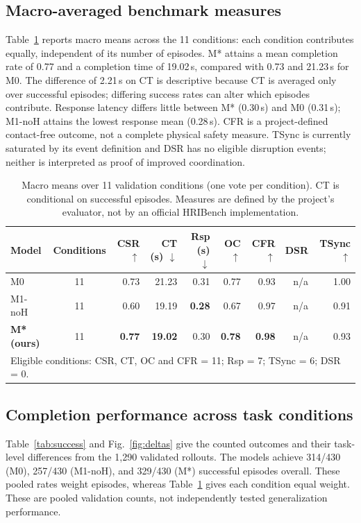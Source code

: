 \documentclass[conference]{IEEEtran}
\begin{document}
\subsection{Macro-averaged benchmark measures}
Table~\ref{tab:macro} reports macro means across the 11 conditions: each condition contributes equally, independent of its number of episodes. M* attains a mean completion rate of 0.77 and a completion time of 19.02\,s, compared with 0.73 and 21.23\,s for M0. The difference of 2.21\,s on CT is descriptive because CT is averaged only over successful episodes; differing success rates can alter which episodes contribute. Response latency differs little between M* (0.30\,s) and M0 (0.31\,s); M1-noH attains the lowest response mean (0.28\,s). CFR is a project-defined contact-free outcome, not a complete physical safety measure. TSync is currently saturated by its event definition and DSR has no eligible disruption events; neither is interpreted as proof of improved coordination.

\begin{table}[t]
\caption{Macro means over 11 validation conditions (one vote per condition). CT is conditional on successful episodes. Measures are defined by the project's evaluator, not by an official HRIBench implementation.}
\label{tab:macro}
\centering\small
\begin{tabular}{lcrrrrrrr}
\toprule
Model & Conditions & CSR $\uparrow$ & CT (s) $\downarrow$ & Rsp (s) $\downarrow$ & OC $\uparrow$ & CFR $\uparrow$ & DSR & TSync $\uparrow$\\
\midrule
M0 & 11 & 0.73 & 21.23 & 0.31 & 0.77 & 0.93 & n/a & 1.00\\
M1-noH & 11 & 0.60 & 19.19 & \textbf{0.28} & 0.67 & 0.97 & n/a & 0.91\\
\textbf{M* (ours)} & 11 & \textbf{0.77} & \textbf{19.02} & 0.30 & \textbf{0.78} & \textbf{0.98} & n/a & 0.93\\
\bottomrule
\multicolumn{9}{l}{\footnotesize Eligible conditions: CSR, CT, OC and CFR = 11; Rsp = 7; TSync = 6; DSR = 0.}
\end{tabular}
\end{table}

\subsection{Completion performance across task conditions}
Table~\ref{tab:success} and Fig.~\ref{fig:deltas} give the counted outcomes and their task-level differences from the 1,290 validated rollouts. The models achieve 314/430 (M0), 257/430 (M1-noH), and 329/430 (M*) successful episodes overall. These pooled rates weight episodes, whereas Table~\ref{tab:macro} gives each condition equal weight. These are pooled validation counts, not independently tested generalization performance.
\end{document}
